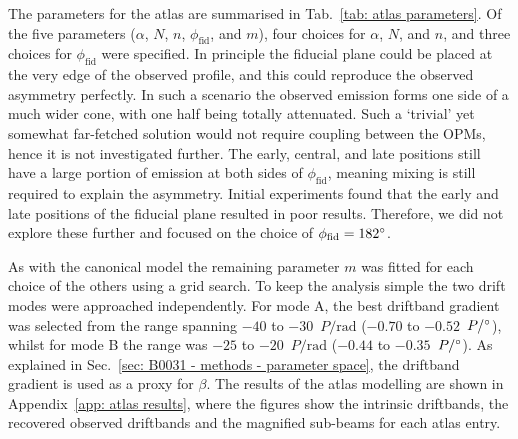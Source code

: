 The parameters for the atlas are summarised in Tab.~\ref{tab: atlas parameters}. Of the five parameters ($\alpha$, $N$, $n$, $\phi_\mathrm{fid}$, and $m$), four choices for $\alpha$, $N$, and $n$, and three choices for $\phi_\mathrm{fid}$ were specified. In principle the fiducial plane could be placed at the very edge of the observed profile, and this could reproduce the observed asymmetry perfectly. In such a scenario the observed emission forms one side of a much wider cone, with one half being totally attenuated. Such a `trivial' yet somewhat far-fetched solution would not require coupling between the OPMs, hence it is not investigated further. The early, central, and late positions still have a large portion of emission at both sides of $\phi_\mathrm{fid}$, meaning mixing is still required to explain the asymmetry. Initial experiments found that the early and late positions of the fiducial plane resulted in poor results. Therefore, we did not explore these further and focused on the choice of $\phi_\mathrm{fid} = 182^\circ$.

As with the canonical model the remaining parameter $m$ was fitted for each choice of the others using a grid search. To keep the analysis simple the two drift modes were approached independently. For mode A, the best driftband gradient was selected from the range spanning $-40$ to $-30$~$P/\text{rad}$ ($-0.70$ to $-0.52$~$P/^\circ$), whilst for mode B the range was $-25$ to $-20$~$P/\text{rad}$ ($-0.44$ to $-0.35$~$P/^\circ$). As explained in Sec.~\ref{sec: B0031 - methods - parameter space}, the driftband gradient is used as a proxy for $\beta$. The results of the atlas modelling are shown in Appendix~\ref{app: atlas results}, where the figures show the intrinsic driftbands, the recovered observed driftbands and the magnified sub-beams for each atlas entry.

